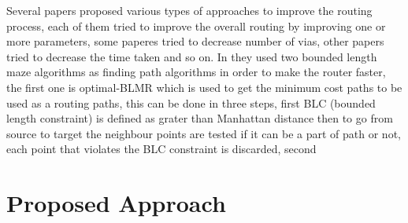 \documentclass[conference]{IEEEtran}
\begin{document}
Several papers proposed various types of approaches to improve the routing process, each of them tried to improve the overall routing by improving one or more parameters, some paperes tried to decrease number of vias, other papers tried to decrease the time taken and so on. In \cite{b2} they used two bounded length maze algorithms as finding path algorithms in order to make the router faster, the first one is optimal-BLMR which is used to get the minimum cost paths to be used as a routing paths, this can be done in three steps, first BLC (bounded length constraint) is defined as grater than Manhattan distance then to go from source to target the neighbour points are tested if it can be a part of path or not, each point that violates the BLC constraint is discarded, second  



\section{Proposed Approach}
\end{document}
